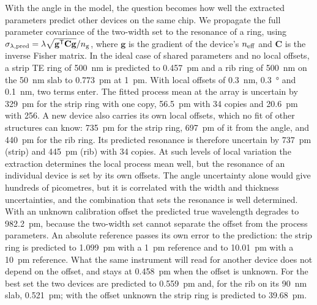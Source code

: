 With the angle in the model, the question becomes how well the extracted parameters predict other devices on the same
chip. We propagate the full parameter covariance of the two-width set to the resonance of a ring, using
$\sigma_{\lambda,\mathrm{pred}}=\lambda\sqrt{\mathbf{g}^{\mathsf T}\mathbf{C}\mathbf{g}}/n_\mathrm{g}$, where $\mathbf{g}$ is the
gradient of the device's $n_\mathrm{eff}$ and $\mathbf{C}$ is the inverse Fisher matrix. In the ideal case of shared parameters and no local
offsets, a strip TE ring of \qty{500}{nm} is predicted to \qty{0.457}{pm} and a rib ring of \qty{500}{nm} on the \qty{50}{nm} slab to
\qty{0.773}{pm} at \qty{1}{pm}. With local offsets of \qty{0.3}{nm}, \qty{0.3}{\degree} and \qty{0.1}{nm}, two terms enter. The fitted process
mean at the array is uncertain by \qty{329}{pm} for the strip ring with one copy, \qty{56.5}{pm} with 34 copies and \qty{20.6}{pm} with
256. A new device also carries its own local offsets, which no fit of other structures can know: \qty{735}{pm} for the strip ring,
\qty{697}{pm} of it from the angle, and \qty{440}{pm} for the rib ring. Its predicted resonance is therefore uncertain by \qty{737}{pm}
(strip) and \qty{445}{pm} (rib) with 34 copies. At such levels of local variation the extraction determines the local process mean well,
but the resonance of an individual device is set by its own offsets. The angle uncertainty alone would give hundreds of picometres, but it is correlated with the width and
thickness uncertainties, and the combination that sets the resonance is well determined. With an unknown calibration
offset the predicted true wavelength degrades to \qty{982.2}{pm}, because the two-width set cannot separate the offset
from the process parameters. An absolute reference passes its own error to the prediction: the strip ring is predicted to
\qty{1.099}{pm} with a \qty{1}{pm} reference and to \qty{10.01}{pm} with a \qty{10}{pm} reference. What the same instrument will read
for another device does not depend on the offset, and stays at \qty{0.458}{pm} when the offset is unknown. For the best set the two devices are predicted to \qty{0.559}{pm} and, for the rib on its
\qty{90}{nm} slab, \qty{0.521}{pm}; with the offset unknown the strip ring is predicted to \qty{39.68}{pm}.
